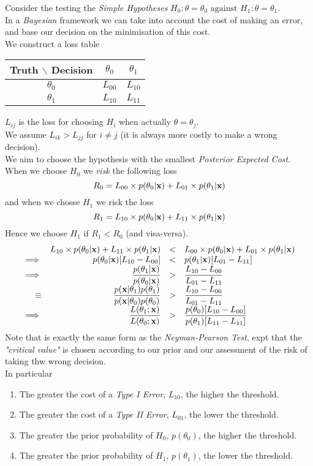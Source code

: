 \documentclass[11pt,a4paper]{article}
\begin{document}
Consider the testing the \textit{Simple Hypotheses} $H_0:\theta=\theta_0\text{ against }H_1:\theta=\theta_1$.\\
In a \textit{Bayesian} framework we can take into account the cost of making an error, and base our decision on the minimisation of this cost.\\
We construct a loss table
\begin{center}\begin{tabular}{|c|c|c|}
\hline
Truth $\backslash$ Decision&$\theta_0$&$\theta_1$\\
\hline
$\theta_0$&$L_{00}$&$L_{10}$\\
\hline
$\theta_1$&$L_{10}$&$L_{11}$\\
\hline
\end{tabular}\end{center}
$L_{ij}$ is the loss for choosing $H_i$ when actually $\theta=\theta_j$.\\
We assume $L_{ik}>L_{jj}$ for $i\neq j$ (\ie it is always more costly to make a wrong decision).\\
We aim to choose the hypothesis with the smallest \textit{Posterior Expected Cost}.\\
When we choose $H_0$ we \textit{risk} the following loss
$$R_0=L_{00}\times p(\theta_0|\textbf{x})+L_{01}\times p(\theta_1|\textbf{x})$$
and when we chosse $H_1$ we risk the loss
$$R_1=L_{10}\times p(\theta_0|\textbf{x})+L_{11}\times p(\theta_1|\textbf{x})$$
Hence we choose $H_1$ if $R_1<R_0$ (and visa-versa). \ie
\[\begin{array}{rrcl}
&L_{10}\times p(\theta_0|\textbf{x})+L_{11}\times p(\theta_1|\textbf{x})&<&L_{00}\times p(\theta_0|\textbf{x})+L_{01}\times p(\theta_1|\textbf{x})\\
\implies&p(\theta_0|\textbf{x})[L_{10}-L_{00}]&<&p(\theta_1|\textbf{x})[L_{01}-L_{11}]\\
\implies&\dfrac{p(\theta_1|\textbf{x})}{p(\theta_0|\textbf{x})}&>&\dfrac{L_{10}-L_{00}}{L_{01}-L_{11}}\\
\equiv&\dfrac{p(\textbf{x}|\theta_1)p(\theta_1)}{p(\textbf{x}|\theta_0)p(\theta_0)}&>&\dfrac{L_{10}-L_{00}}{L_{01}-L_{11}}\\
\implies&\dfrac{L(\theta_1;\textbf{x})}{L(\theta_0;\textbf{x})}&>&\dfrac{p(\theta_0)[L_{10}-L_{00}]}{p(\theta_1)[L_{11}-L_{11}]}
\end{array}\]
Note that is exactly the same form as the \textit{Neyman-Pearson Test}, expt that the \textit{"critical value"} is chosen according to our prior and our assessment of the risk of taking thw wrong decision.\\
In particular
\begin{enumerate}
	\item The greater the cost of a \textit{Type I Error}, $L_{10}$, the higher the threshold.
	\item The greater the cost of a \textit{Type II Error}, $L_{01}$, the lower the threshold.
	\item The greater the prior probability of $H_0$, $p(\theta_0)$, the higher the threshold.
	\item The greater the prior probability of $H_1$, $p(\theta_1)$, the lower the threshold.
\end{enumerate}
\end{document}
